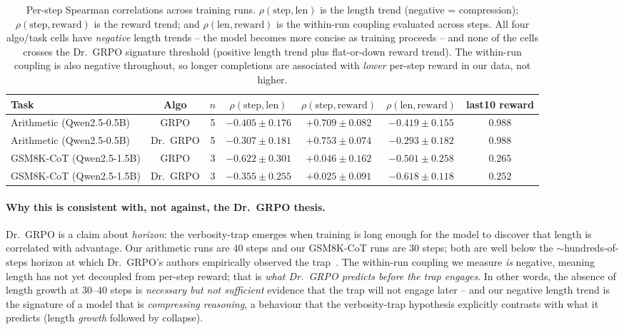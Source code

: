 \begin{table}[htbp]
\centering
\small
\begin{tabular}{lcccccc}
\toprule
Task & Algo & $n$ & $\rho(\text{step},\text{len})$
   & $\rho(\text{step},\text{reward})$ & $\rho(\text{len},\text{reward})$
   & last10 reward \\
\midrule
Arithmetic (Qwen2.5-0.5B)   & GRPO     & 5 & $-0.405 \pm 0.176$ & $+0.709 \pm 0.082$ & $-0.419 \pm 0.155$ & $0.988$ \\
Arithmetic (Qwen2.5-0.5B)   & Dr.~GRPO & 5 & $-0.307 \pm 0.181$ & $+0.753 \pm 0.074$ & $-0.293 \pm 0.182$ & $0.988$ \\
GSM8K-CoT (Qwen2.5-1.5B)    & GRPO     & 3 & $-0.622 \pm 0.301$ & $+0.046 \pm 0.162$ & $-0.501 \pm 0.258$ & $0.265$ \\
GSM8K-CoT (Qwen2.5-1.5B)    & Dr.~GRPO & 3 & $-0.355 \pm 0.255$ & $+0.025 \pm 0.091$ & $-0.618 \pm 0.118$ & $0.252$ \\
\bottomrule
\end{tabular}
\caption{Per-step Spearman correlations across training runs. $\rho(\text{step},\text{len})$ is the
length trend (negative = compression); $\rho(\text{step},\text{reward})$ is the reward trend; and
$\rho(\text{len},\text{reward})$ is the within-run coupling evaluated across steps. All four
algo/task cells have \emph{negative} length trends -- the model becomes more concise as training
proceeds -- and none of the cells crosses the Dr.~GRPO signature threshold (positive length trend
plus flat-or-down reward trend). The within-run coupling is also negative throughout, so longer
completions are associated with \emph{lower} per-step reward in our data, not higher.}
\label{tab:length-bias-summary}
\end{table}

\paragraph{Why this is consistent with, not against, the Dr.~GRPO thesis.}
Dr.~GRPO is a claim about \emph{horizon}: the verbosity-trap emerges
when training is long enough for the model to discover that length
is correlated with advantage. Our arithmetic runs are $40$ steps
and our GSM8K-CoT runs are $30$ steps; both are well below the
$\sim$hundreds-of-steps horizon at which Dr.~GRPO's authors
empirically observed the trap~\cite{tong2025drgrpo}. The
within-run coupling we measure \emph{is} negative, meaning
length has not yet decoupled from per-step reward; that is
\emph{what Dr.~GRPO predicts before the trap engages}. In other
words, the absence of length growth at $30$--$40$ steps is
\emph{necessary but not sufficient} evidence that the trap will
not engage later -- and our negative length trend is the signature
of a model that is \emph{compressing reasoning}, a behaviour that
the verbosity-trap hypothesis explicitly contrasts with what it
predicts (length \emph{growth} followed by collapse).

